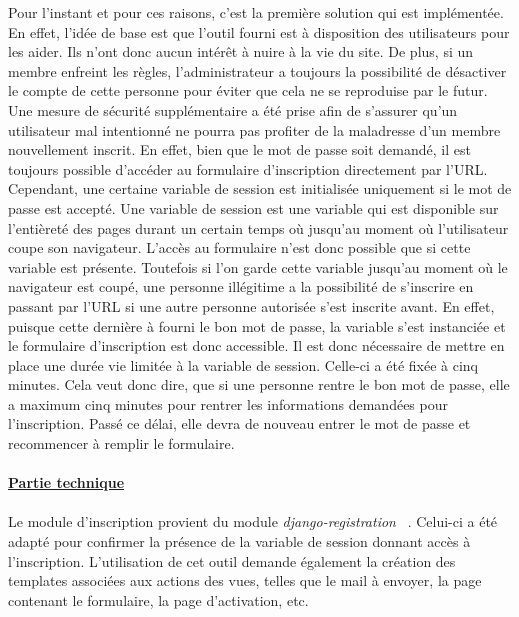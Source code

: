 \documentclass[12pt, a4paper, oneside]{article}
\begin{document}
    \indent Pour l'instant et pour ces raisons, c'est la première solution qui est implémentée. En effet, l'idée de base est que l'outil fourni est à disposition des utilisateurs pour les aider. Ils n'ont donc aucun intérêt à nuire à la vie du site. De plus, si un membre enfreint les règles, l'administrateur a toujours la possibilité de désactiver le compte de cette personne pour éviter que cela ne se reproduise par le futur. Une mesure de sécurité supplémentaire a été prise afin de s'assurer qu'un utilisateur mal intentionné ne pourra pas profiter de la maladresse d'un membre nouvellement inscrit. En effet, bien que le mot de passe soit demandé, il est toujours possible d'accéder au formulaire d'inscription directement par l'URL. Cependant, une certaine variable de session est initialisée uniquement si le mot de passe est accepté. Une variable de session est une variable qui est disponible sur l'entièreté des pages durant un certain temps où jusqu'au moment où l'utilisateur coupe son navigateur. L'accès au formulaire n'est donc possible que si cette variable est présente. Toutefois si l'on garde cette variable jusqu'au moment où le navigateur est coupé, une personne illégitime a la possibilité de s'inscrire en passant par l'URL si une autre personne autorisée s'est inscrite avant. En effet, puisque cette dernière à fourni le bon mot de passe, la variable s'est instanciée et le formulaire d'inscription est donc accessible. Il est donc nécessaire de mettre en place une durée vie limitée à la variable de session. Celle-ci a été fixée à cinq minutes. Cela veut donc dire, que si une personne rentre le bon mot de passe, elle a maximum cinq minutes pour rentrer les informations demandées pour l'inscription. Passé ce délai, elle devra de nouveau entrer le mot de passe et recommencer à remplir le formulaire.\\\\
\underline{\textbf{Partie technique}} \\\\
    \indent Le module d'inscription provient du module \textit{django-registration} ~\cite{django-registration}. Celui-ci a été adapté pour confirmer la présence de la variable de session donnant accès à l'inscription. L'utilisation de cet outil demande également la création des templates associées aux actions des vues, telles que le mail à envoyer, la page contenant le formulaire, la page d'activation, etc.\\
\end{document}
